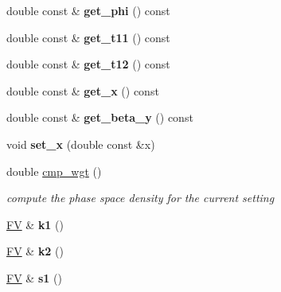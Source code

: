 \begin{DoxyCompactItemize}
\item 
\hypertarget{classPS__2__2_a28bf4d69f8fcb2b359f521289a6a70d1}{double const \& {\bfseries get\-\_\-phi} () const }\label{classPS__2__2_a28bf4d69f8fcb2b359f521289a6a70d1}

\item 
\hypertarget{classPS__2__2_ae717002f8f6d84446f4353aa3cc97757}{double const \& {\bfseries get\-\_\-t11} () const }\label{classPS__2__2_ae717002f8f6d84446f4353aa3cc97757}

\item 
\hypertarget{classPS__2__2_a9e2bc01c150ce569013cebf16ca34528}{double const \& {\bfseries get\-\_\-t12} () const }\label{classPS__2__2_a9e2bc01c150ce569013cebf16ca34528}

\item 
\hypertarget{classPS__2__2_a3b1392c5e6a6e894b87926611333e782}{double const \& {\bfseries get\-\_\-x} () const }\label{classPS__2__2_a3b1392c5e6a6e894b87926611333e782}

\item 
\hypertarget{classPS__2__2_a7c253fa9526fb882c0fb386700f0a084}{double const \& {\bfseries get\-\_\-beta\-\_\-y} () const }\label{classPS__2__2_a7c253fa9526fb882c0fb386700f0a084}

\item 
\hypertarget{classPS__2__2_ab38bb5b8ac36bea7b044a72d0c9cfdbb}{void {\bfseries set\-\_\-x} (double const \&x)}\label{classPS__2__2_ab38bb5b8ac36bea7b044a72d0c9cfdbb}

\item 
\hypertarget{classPS__2__2_ad816da6fba743fbe6d7e67e119ad1cca}{double \hyperlink{classPS__2__2_ad816da6fba743fbe6d7e67e119ad1cca}{cmp\-\_\-wgt} ()}\label{classPS__2__2_ad816da6fba743fbe6d7e67e119ad1cca}

\begin{DoxyCompactList}\small\item\em compute the phase space density for the current setting \end{DoxyCompactList}\item 
\hypertarget{classPS__2__2_a11a23bbf3ce1288121b6f798012039ea}{\hyperlink{classFV}{F\-V} \& {\bfseries k1} ()}\label{classPS__2__2_a11a23bbf3ce1288121b6f798012039ea}

\item 
\hypertarget{classPS__2__2_ae80de8ff0390f3a92cf8cb55bafcfa39}{\hyperlink{classFV}{F\-V} \& {\bfseries k2} ()}\label{classPS__2__2_ae80de8ff0390f3a92cf8cb55bafcfa39}

\item 
\hypertarget{classPS__2__2_a1776cf6ac281264536b089e88a7507f1}{\hyperlink{classFV}{F\-V} \& {\bfseries s1} ()}\label{classPS__2__2_a1776cf6ac281264536b089e88a7507f1}


\end{DoxyCompactItemize}

